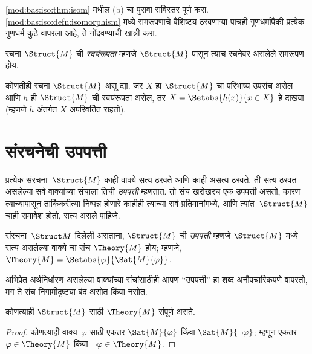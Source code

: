 \begin{prob}
\ref{mod:bas:iso:thm:isom} मधील (b) चा पुरावा सविस्तर पूर्ण करा.
\ref{mod:bas:iso:defn:isomorphism} मध्ये समरूपणाचे वैशिष्ट्य ठरवणाऱ्या
पाचही गुणधर्मांपैकी प्रत्येक गुणधर्म कुठे वापरला आहे, ते नोंदवण्याची
खात्री करा.
\end{prob}

\begin{defn}
रचना $\Struct{M}$ ची \emph{स्वयंरूपता} म्हणजे $\Struct{M}$ पासून
त्याच रचनेवर असलेले समरूपण होय.
\end{defn}

\begin{prob}
कोणतीही रचना $\Struct{M}$ असू द्या. जर $X$ हा $\Struct{M}$ चा परिभाष्य
उपसंच असेल आणि $h$ ही $\Struct{M}$ ची स्वयंरूपता असेल, तर $X
= \Setabs{h(x)}{x \in X}$ हे दाखवा (म्हणजे $h$ अंतर्गत $X$ अपरिवर्तित
राहतो).
\end{prob}













\section{संरचनेची उपपत्ती}\label{mod:bas:thm:sec}

प्रत्येक संरचना~$\Struct{M}$ काही वाक्ये सत्य ठरवते आणि
काही असत्य ठरवते. ती सत्य ठरवत असलेल्या सर्व वाक्यांच्या संचाला
तिची \emph{उपपत्ती} म्हणतात. तो संच खरोखरच एक उपपत्ती असतो, कारण
त्याच्यापासून तार्किकरीत्या निष्पन्न होणारे काहीही त्याच्या सर्व
प्रतिमानांमध्ये, आणि त्यांत~$\Struct{M}$ चाही समावेश होतो, सत्य असले
पाहिजे.

\begin{defn}
  संरचना~$\Struct M$ दिलेली असताना, $\Struct{M}$ ची
  \emph{उपपत्ती} म्हणजे $\Struct{M}$ मध्ये सत्य असलेल्या वाक्ये
  चा संच $\Theory{M}$ होय; म्हणजे, $\Theory{M} =
  \Setabs{\varphi}{\Sat{M}{\varphi}}$.
\end{defn}

अभिप्रेत अर्थनिर्धारण असलेल्या वाक्यांच्या संचांसाठीही आपण
``उपपत्ती'' हा शब्द अनौपचारिकपणे वापरतो, मग ते संच निगामीदृष्ट्या बंद
असोत किंवा नसोत.

\begin{prop}
कोणत्याही $\Struct{M}$ साठी $\Theory{M}$ संपूर्ण असते.
\end{prop}

\begin{proof}
कोणत्याही वाक्य~$\varphi$ साठी एकतर $\Sat{M}{\varphi}$ किंवा
$\Sat{M}{\lnot \varphi}$; म्हणून एकतर $\varphi \in \Theory{M}$ किंवा
$\lnot \varphi \in \Theory{M}$.
\end{proof}

